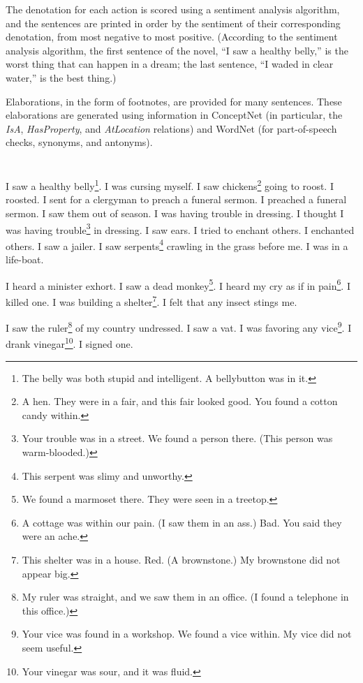 \documentclass[12pt]{book}
\begin{document}
The denotation for each action is scored using a sentiment analysis algorithm,
and the sentences are printed in order by the sentiment of their corresponding
denotation, from most negative to most positive. (According to the sentiment
analysis algorithm, the first sentence of the novel, ``I saw a healthy belly,'' is the worst
thing that can happen in a dream; the last sentence, ``I waded in clear water,''
is the best thing.)

Elaborations, in the form of footnotes, are provided for many sentences. These
elaborations are generated using information in ConceptNet (in particular, the
\textit{IsA}, \textit{HasProperty}, and \textit{AtLocation} relations) and WordNet (for part-of-speech
checks, synonyms, and antonyms).

\mainmatter



\chapter{}

I saw a healthy belly\footnote{The belly was both stupid and intelligent. A bellybutton was in it.}. I was cursing myself. I saw chickens\footnote{A hen. They were in a fair, and this fair looked good. You found a cotton candy within.} going to roost. I roosted. I sent for a clergyman to preach a funeral sermon. I preached a funeral sermon. I saw them out of season. I was having trouble in dressing. I thought I was having trouble\footnote{Your trouble was in a street. We found a person there. (This person was warm-blooded.)} in dressing. I saw ears. I tried to enchant others. I enchanted others. I saw a jailer. I saw serpents\footnote{This serpent was slimy and unworthy.} crawling in the grass before me. I was in a life-boat. 

 I heard a minister exhort. I saw a dead monkey\footnote{We found a marmoset there. They were seen in a treetop.}. I heard my cry as if in pain\footnote{A cottage was within our pain. (I saw them in an ass.) Bad. You said they were an ache.}. I killed one. I was building a shelter\footnote{This shelter was in a house. Red. (A brownstone.) My brownstone did not appear big.}. I felt that any insect stings me. 

 I saw the ruler\footnote{My ruler was straight, and we saw them in an office. (I found a telephone in this office.)} of my country undressed. I saw a vat. I was favoring any vice\footnote{Your vice was found in a workshop. We found a vice within. My vice did not seem useful.}. I drank vinegar\footnote{Your vinegar was sour, and it was fluid.}. I signed one. 
\end{document}
